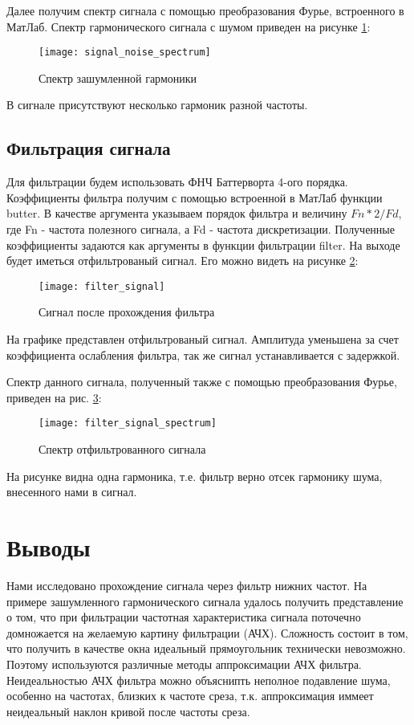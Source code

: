 Далее получим спектр сигнала с помощью преобразования Фурье, встроенного в МатЛаб. Спектр гармонического сигнала с шумом приведен на рисунке \ref{pic:signal_noise_spectrum}:
\begin{figure}[H]
	\begin{center}
		\texttt{[image: signal\_noise\_spectrum]}
		\caption{Спектр зашумленной гармоники} 
		\label{pic:signal_noise_spectrum} %
	\end{center}
\end{figure}
В сигнале присутствуют несколько гармоник разной частоты.

\subsection{Фильтрация сигнала}
Для фильтрации будем использовать ФНЧ Баттерворта 4-ого порядка. Коэффициенты фильтра получим с помощью встроенной в МатЛаб функции butter. В качестве аргумента указываем порядок фильтра и величину $Fn*2/Fd$, где Fn - частота полезного сигнала, а Fd - частота дискретизации.
Полученные коэффициенты задаются как аргументы в функции фильтрации filter. На выходе будет иметься отфильтрованый сигнал. Его можно видеть на рисунке \ref{pic:filter_signal}:
\begin{figure}[H]
	\begin{center}
		\texttt{[image: filter\_signal]}
		\caption{Сигнал после прохождения фильтра} 
		\label{pic:filter_signal} %
	\end{center}
\end{figure}
На графике представлен отфильтрованый сигнал. Амплитуда уменьшена за счет коэффициента ослабления фильтра, так же сигнал устанавливается с задержкой.

Спектр данного сигнала, полученный также с помощью преобразования Фурье, приведен на рис. \ref{pic:filter_signal_spectrum}:
\begin{figure}[H]
	\begin{center}
		\texttt{[image: filter\_signal\_spectrum]}
		\caption{Спектр отфильтрованного сигнала} 
		\label{pic:filter_signal_spectrum} %
	\end{center}
\end{figure}
На рисунке видна одна гармоника, т.е. фильтр верно отсек гармонику шума, внесенного нами в сигнал.

\section{Выводы}

Нами исследовано прохождение сигнала через фильтр нижних частот. На примере зашумленного гармонического сигнала удалось получить представление о том, что при фильтрации частотная характеристика сигнала поточечно домножается на желаемую картину фильтрации (АЧХ). Сложность состоит в том, что получить в качестве окна идеальный прямоугольник технически невозможно. Поэтому используются различные методы аппроксимации АЧХ фильтра. Неидеальностью АЧХ фильтра можно объяснипть неполное подавление шума, особенно на частотах, близких к частоте среза, т.к. аппроксимация иммеет неидеальный наклон кривой после частоты среза.


